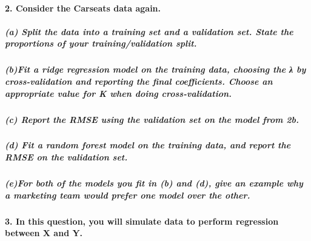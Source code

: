 \documentclass[
]{article}
\begin{document}
\hypertarget{consider-the-carseats-data-again.}{%
\paragraph{2. Consider the Carseats data
again.}\label{consider-the-carseats-data-again.}}

\hypertarget{a-split-the-data-into-a-training-set-and-a-validation-set.-state-the-proportions-of-your-trainingvalidation-split.}{%
\subparagraph{(a) Split the data into a training set and a validation
set. State the proportions of your training/validation
split.}\label{a-split-the-data-into-a-training-set-and-a-validation-set.-state-the-proportions-of-your-trainingvalidation-split.}}

\hypertarget{bfit-a-ridge-regression-model-on-the-training-data-choosing-the-ux3bb-by-cross-validation-and-reporting-the-final-coefficients.-choose-an-appropriate-value-for-k-when-doing-cross-validation.}{%
\subparagraph{(b)Fit a ridge regression model on the training data,
choosing the λ by cross-validation and reporting the final coefficients.
Choose an appropriate value for K when doing
cross-validation.}\label{bfit-a-ridge-regression-model-on-the-training-data-choosing-the-ux3bb-by-cross-validation-and-reporting-the-final-coefficients.-choose-an-appropriate-value-for-k-when-doing-cross-validation.}}

\hypertarget{c-report-the-rmse-using-the-validation-set-on-the-model-from-2b.}{%
\subparagraph{(c) Report the RMSE using the validation set on the model
from
2b.}\label{c-report-the-rmse-using-the-validation-set-on-the-model-from-2b.}}

\hypertarget{d-fit-a-random-forest-model-on-the-training-data-and-report-the-rmse-on-the-validation-set.}{%
\subparagraph{(d) Fit a random forest model on the training data, and
report the RMSE on the validation
set.}\label{d-fit-a-random-forest-model-on-the-training-data-and-report-the-rmse-on-the-validation-set.}}

\hypertarget{efor-both-of-the-models-you-fit-in-b-and-d-give-an-example-why-a-marketing-team-would-prefer-one-model-over-the-other.}{%
\subparagraph{(e)For both of the models you fit in (b) and (d), give an
example why a marketing team would prefer one model over the
other.}\label{efor-both-of-the-models-you-fit-in-b-and-d-give-an-example-why-a-marketing-team-would-prefer-one-model-over-the-other.}}

\hypertarget{in-this-question-you-will-simulate-data-to-perform-regression-between-x-and-y.}{%
\paragraph{3. In this question, you will simulate data to perform
regression between X and
Y.}\label{in-this-question-you-will-simulate-data-to-perform-regression-between-x-and-y.}}
\end{document}
